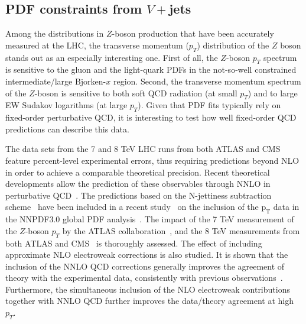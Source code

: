 \documentclass[a4paper,11pt,notoc]{article}
\newcommand{\pt}{\ensuremath{\mathrm{p_T}}}
\begin{document}
\subsection{PDF constraints from $V+$jets}
Among the distributions in $Z$-boson production that have been accurately measured at the LHC, the transverse momentum ($p_T$) distribution of the $Z$ boson
stands out as an especially interesting one.
First of all, the $Z$-boson $p_T$ spectrum is sensitive to the gluon 
and the light-quark PDFs in the not-so-well constrained intermediate/large 
Bjorken-$x$ region.
Second, the transverse momentum spectrum of the $Z$-boson is sensitive to 
both soft QCD radiation (at small $p_T$) and to large EW  
Sudakov logarithms (at large $p_T$). Given that PDF fits typically rely 
on fixed-order perturbative QCD, it is interesting to test how well 
fixed-order QCD predictions can describe this data. 

The data sets from the 7 and 8 TeV LHC runs from both ATLAS and CMS 
feature percent-level experimental errors, thus requiring 
predictions beyond NLO in order to achieve a comparable theoretical precision.
Recent theoretical developments allow the prediction of these observables 
through NNLO in perturbative QCD~\cite{Boughezal:2015ded,Boughezal:2016isb,Ridder:2016nkl,Gehrmann-DeRidder:2016jns}. 
The predictions based on the N-jettiness subtraction scheme~\cite{Boughezal:2015ded,Boughezal:2016isb} have been included in a recent 
study~\cite{Boughezal:2017nla} on the inclusion of the $\pt$ data 
in the NNPDF3.0 global PDF analysis~\cite{Ball:2014uwa}.
The impact of the 7 TeV measurement of the $Z$-boson $p_T$ by the ATLAS 
collaboration~\cite{Aad:2014xaa}, and the 8 TeV measurements from both 
ATLAS and CMS~\cite{Aad:2015auj,Khachatryan:2015oaa} is thoroughly assessed.  
The effect of including approximate NLO electroweak corrections is also studied.
It is shown that the inclusion of the NNLO QCD corrections generally improves 
the agreement of theory with the experimental data, consistently with 
previous observations~\cite{Ridder:2016nkl,Gehrmann-DeRidder:2016jns}. 
Furthermore, the simultaneous inclusion of the NLO electroweak contributions 
together with NNLO QCD further improves the data/theory agreement at high $p_T$.
\end{document}
